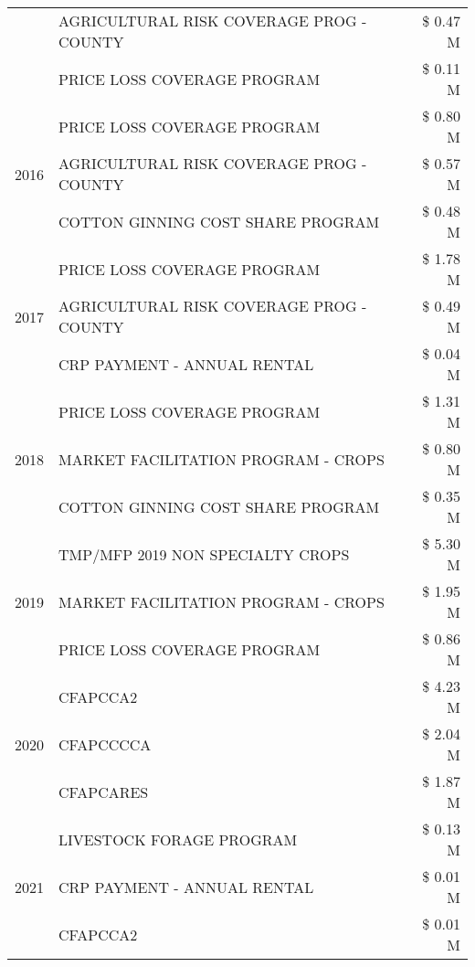 \begin{tabular}{llr}
 & AGRICULTURAL RISK COVERAGE PROG - COUNTY & \$ 0.47 M \\
 & PRICE LOSS COVERAGE PROGRAM & \$ 0.11 M \\
\cline{1-3}
\multirow[t]{3}{*}{2016} & PRICE LOSS COVERAGE PROGRAM & \$ 0.80 M \\
 & AGRICULTURAL RISK COVERAGE PROG - COUNTY & \$ 0.57 M \\
 & COTTON GINNING COST SHARE PROGRAM & \$ 0.48 M \\
\cline{1-3}
\multirow[t]{3}{*}{2017} & PRICE LOSS COVERAGE PROGRAM & \$ 1.78 M \\
 & AGRICULTURAL RISK COVERAGE PROG - COUNTY & \$ 0.49 M \\
 & CRP PAYMENT - ANNUAL RENTAL & \$ 0.04 M \\
\cline{1-3}
\multirow[t]{3}{*}{2018} & PRICE LOSS COVERAGE PROGRAM & \$ 1.31 M \\
 & MARKET FACILITATION PROGRAM - CROPS & \$ 0.80 M \\
 & COTTON GINNING COST SHARE PROGRAM & \$ 0.35 M \\
\cline{1-3}
\multirow[t]{3}{*}{2019} & TMP/MFP 2019 NON SPECIALTY CROPS & \$ 5.30 M \\
 & MARKET FACILITATION PROGRAM - CROPS & \$ 1.95 M \\
 & PRICE LOSS COVERAGE PROGRAM & \$ 0.86 M \\
\cline{1-3}
\multirow[t]{3}{*}{2020} & CFAPCCA2 & \$ 4.23 M \\
 & CFAPCCCCA & \$ 2.04 M \\
 & CFAPCARES & \$ 1.87 M \\
\cline{1-3}
\multirow[t]{3}{*}{2021} & LIVESTOCK FORAGE PROGRAM & \$ 0.13 M \\
 & CRP PAYMENT - ANNUAL RENTAL & \$ 0.01 M \\
 & CFAPCCA2 & \$ 0.01 M \\
\cline{1-3}
\bottomrule
\end{tabular}

